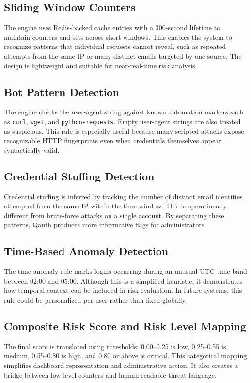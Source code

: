 \documentclass[12pt,a4paper]{report}
\begin{document}
\subsection{Sliding Window Counters}
The engine uses Redis-backed cache entries with a 300-second lifetime to maintain counters and sets across short windows. This enables the system to recognize patterns that individual requests cannot reveal, such as repeated attempts from the same IP or many distinct emails targeted by one source. The design is lightweight and suitable for near-real-time risk analysis.

\subsection{Bot Pattern Detection}
The engine checks the user-agent string against known automation markers such as \texttt{curl}, \texttt{wget}, and \texttt{python-requests}. Empty user-agent strings are also treated as suspicious. This rule is especially useful because many scripted attacks expose recognizable HTTP fingerprints even when credentials themselves appear syntactically valid.

\subsection{Credential Stuffing Detection}
Credential stuffing is inferred by tracking the number of distinct email identities attempted from the same IP within the time window. This is operationally different from brute-force attacks on a single account. By separating these patterns, Qauth produces more informative flags for administrators.

\subsection{Time-Based Anomaly Detection}
The time anomaly rule marks logins occurring during an unusual UTC time band between 02:00 and 05:00. Although this is a simplified heuristic, it demonstrates how temporal context can be included in risk evaluation. In future systems, this rule could be personalized per user rather than fixed globally.

\subsection{Composite Risk Score and Risk Level Mapping}
The final score is translated using thresholds: 0.00--0.25 is low, 0.25--0.55 is medium, 0.55--0.80 is high, and 0.80 or above is critical. This categorical mapping simplifies dashboard representation and administrative action. It also creates a bridge between low-level counters and human-readable threat language.
\end{document}
